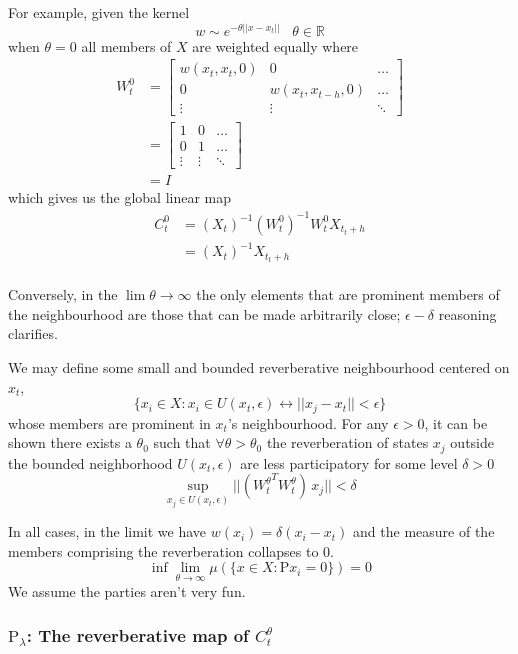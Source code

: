 \documentclass{article}
\newcommand{\R}{\mathbb{R}}
\newcommand{\Rho}{\mathrm{P}}
\begin{document}
For example, given the kernel
$$
    w \sim e^{-\theta ||x - x_t||}\hspace{10pt}\theta \in \R
$$ 
when $\theta=0$ all members of $X$ are weighted equally where 
\begin{align*}
    W_t^0 &= 
    \begin{bmatrix*}
        w(x_t, x_t, 0) & 0  & \hdots\\
        0 & w(x_t, x_{t-h}, 0)  & \hdots\\
        \vdots & \vdots & \ddots
    \end{bmatrix*} \\
    &= \begin{bmatrix*}
        1 &  0 & \hdots\\
        0 & 1 & \hdots\\
        \vdots &  \vdots & \ddots
    \end{bmatrix*}\\
    &= I
\end{align*}
which gives us the global linear map
\begin{align*}
    C_t^0 &= (X_t)^{-1} ({W_t^0})^{-1} {W_t^0} X_{t_t+h}\\
    &= (X_t)^{-1} X_{t_t+h}\\
\end{align*}


Conversely, in the $\lim\theta\rightarrow\infty$ the only elements that are prominent members of the neighbourhood are those that can be made arbitrarily close; $\epsilon-\delta$ reasoning clarifies.

We may define some small and bounded reverberative neighbourhood centered on $x_t$, 
$$
    \{x_i \in X: x_i \in U(x_t, \epsilon) \leftrightarrow ||x_j-x_t|| < \epsilon\}
$$
whose members are prominent in $x_t$'s neighbourhood. For any $\epsilon > 0$, it can be shown there exists a $\theta_0$ such that $\forall \theta > \theta_0$ the reverberation of states $x_j$ outside the bounded neighborhood $U(x_t,\epsilon)$ are less participatory for some level $\delta>0$
$$
    \sup_{x_j\in U(x_t, \epsilon)} ||({W_t^\theta}^T W_t^\theta) \, x_j|| < \delta
$$

In all cases, in the limit we have $w(x_i) = \delta(x_i-x_t)$ and the measure of the members comprising the reverberation collapses to 0.
$$
    \inf\lim_{\theta\rightarrow\infty}\mu(\{x\in X: \Rho x_i = 0\}) = 0
$$
We assume the parties aren't very fun.

\subsubsection{$\Rho_\lambda$: The reverberative map of $C_t^\theta$}
\end{document}
